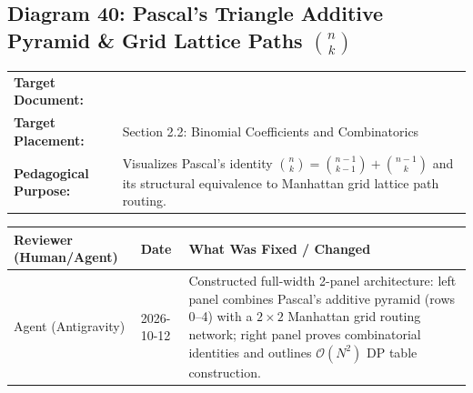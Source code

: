 \documentclass[11pt,a4paper]{article}
\newcommand{\breadcrumb}[3]{
    \par\vspace{0.15cm}
    \noindent\begin{tabularx}{\textwidth}{|l|X|}
    \hline
    \textbf{Target Document:} & \texttt{\detokenize{#1}} \\
    \textbf{Target Placement:} & #2 \\
    \textbf{Pedagogical Purpose:} & #3 \\
    \hline
    \end{tabularx}
    \vspace{0.15cm}\par
}
\newcommand{\diagramaudit}[3]{
    \par\vspace{0.12cm}
    \noindent\begin{tabularx}{\textwidth}{|l|l|>{\raggedright\arraybackslash}X|}
    \hline
    \textbf{Reviewer (Human/Agent)} & \textbf{Date} & \textbf{What Was Fixed / Changed} \\ \hline
    #1 & #2 & #3 \\ \hline
    \end{tabularx}
    \vspace{0.12cm}\par
}
\begin{document}
\newpage
\newpage
\newpage

\subsection[Diagram 40: Pascal's Triangle and Grid Lattice Paths]{Diagram 40: Pascal's Triangle Additive Pyramid \& Grid Lattice Paths $\binom{n}{k}$}

\breadcrumb{01.math_foundations.tex}{Section 2.2: Binomial Coefficients and Combinatorics}{Visualizes Pascal's identity $\binom{n}{k} = \binom{n-1}{k-1} + \binom{n-1}{k}$ and its structural equivalence to Manhattan grid lattice path routing.}

\diagramaudit{Agent (Antigravity)}{2026-10-12}{Constructed full-width 2-panel architecture: left panel combines Pascal's additive pyramid (rows 0--4) with a $2 \times 2$ Manhattan grid routing network; right panel proves combinatorial identities and outlines $\mathcal{O}(N^2)$ DP table construction.}
\end{document}
